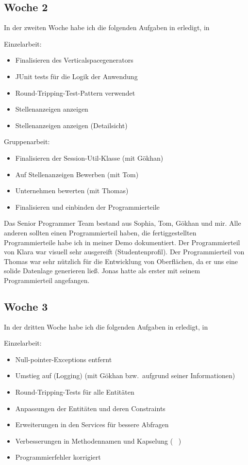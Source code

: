 \subsection{Woche 2}\label{subsec:s2w2}
In der zweiten Woche habe ich die folgenden Aufgaben in erledigt, in

Einzelarbeit:
\begin{itemize}
    \item Finalisieren des Verticalspacegenerators
    \item JUnit tests für die Logik der Anwendung
    \item Round-Tripping-Test-Pattern verwendet
    \item Stellenanzeigen anzeigen
    \item Stellenanzeigen anzeigen (Detailsicht)

\end{itemize}

Gruppenarbeit:

\begin{itemize}
    \item Finalisieren der Session-Util-Klasse (mit Gökhan)
    \item Auf Stellenanzeigen Bewerben (mit Tom)
    \item Unternehmen bewerten (mit Thomas)
    \item Finalisieren und einbinden der Programmierteile
\end{itemize}
Das Senior Programmer Team bestand aus Sophia, Tom, Gökhan und mir.
Alle anderen sollten einen Programmierteil haben, die fertiggestellten Programmierteile habe ich
in meiner Demo\cite*[]{demo1} dokumentiert.
Der Programmierteil von Klara war visuell sehr ausgereift (Studentenprofil).
Der Programmierteil von Thomas war sehr nützlich für die Entwicklung von Oberflächen, da er uns
eine solide Datenlage generieren ließ.
Jonas hatte als erster mit seinem Programmierteil angefangen.

\pagebreak

\subsection{Woche 3}\label{subsec:s2w3}
In der dritten Woche habe ich die folgenden Aufgaben in erledigt, in

Einzelarbeit:
\begin{itemize}
    \item Null-pointer-Exceptions entfernt
    \item Umstieg auf  (Logging) (mit Gökhan bzw.\ aufgrund seiner Informationen)
    \item Round-Tripping-Tests für alle Entitäten
    \item Anpassungen der Entitäten und deren Constraints
    \item Erweiterungen in den Services für bessere Abfragen
    \item Verbesserungen in Methodennamen und Kapselung ( \textrightarrow \ )
    \item Programmierfehler korrigiert
\end{itemize}

